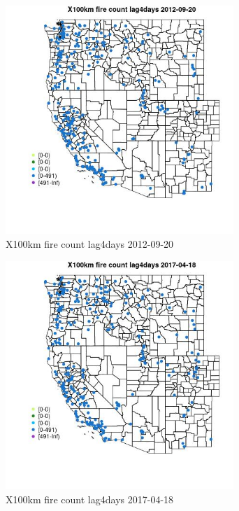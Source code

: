 \begin{figure} 
\centering  
\includegraphics[width=0.77\textwidth]{Code_Outputs/Report_ML_input_PM25_Step4_part_e_de_duplicated_aves_compiled_2019-05-14wNAs_MapObsX100km_fire_count_lag4days2012-09-20.jpg} 
\caption{\label{fig:Report_ML_input_PM25_Step4_part_e_de_duplicated_aves_compiled_2019-05-14wNAsMapObsX100km_fire_count_lag4days2012-09-20}X100km fire count lag4days 2012-09-20} 
\end{figure} 
 

\begin{figure} 
\centering  
\includegraphics[width=0.77\textwidth]{Code_Outputs/Report_ML_input_PM25_Step4_part_e_de_duplicated_aves_compiled_2019-05-14wNAs_MapObsX100km_fire_count_lag4days2017-04-18.jpg} 
\caption{\label{fig:Report_ML_input_PM25_Step4_part_e_de_duplicated_aves_compiled_2019-05-14wNAsMapObsX100km_fire_count_lag4days2017-04-18}X100km fire count lag4days 2017-04-18} 
\end{figure} 
 

